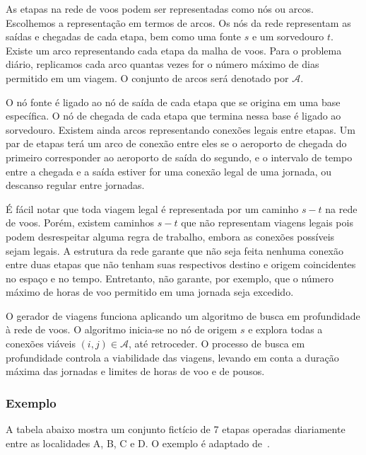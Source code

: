 \documentclass[12pt,a4paper]{article}
\newcommand{\calA}{\mathcal{A}}
\begin{document}
As etapas na rede de voos podem ser representadas como nós ou arcos. Escolhemos a representação em
termos de arcos. Os nós da rede representam as saídas e chegadas de cada etapa, bem como uma fonte
$s$ e um sorvedouro $t$. Existe um arco representando cada etapa da malha de voos. Para o problema
diário, replicamos cada arco quantas vezes for o número máximo de dias permitido em um viagem. O
conjunto de arcos será denotado por $\calA$.

O nó fonte é ligado ao nó de saída de cada etapa que se origina em uma base específica. O nó de
chegada de cada etapa que termina nessa base é ligado ao sorvedouro. Existem ainda arcos
representando conexões legais entre etapas. Um par de etapas terá um arco de conexão entre eles se
o aeroporto de chegada do primeiro corresponder ao aeroporto de saída do segundo, e o intervalo de
tempo entre a chegada e a saída estiver for uma conexão legal de uma jornada, 
ou descanso regular entre jornadas. 

É fácil notar que toda viagem legal é representada por um caminho $s-t$ na rede de voos. Porém,
existem caminhos $s-t$ que não representam viagens legais pois podem desrespeitar alguma regra de
trabalho, embora as conexões possíveis sejam legais. A estrutura da rede garante que não seja feita
nenhuma conexão entre duas etapas que não tenham suas respectivos destino e origem coincidentes no
espaço e no tempo. Entretanto, não garante, por exemplo, que o número máximo de horas de voo
permitido em uma jornada seja excedido. 

O gerador de viagens funciona aplicando um algoritmo de busca em profundidade à rede de voos. O
algoritmo inicia-se no nó de origem $s$ e explora todas a conexões viáveis $(i, j) \in \calA$, até
retroceder. O processo de busca em profundidade controla a viabilidade das viagens, levando em conta
a duração máxima das jornadas e limites de horas de voo e de pousos.

\subsubsection{Exemplo}
\label{sec:exemplo}

A tabela abaixo mostra um conjunto fictício de 7 etapas operadas diariamente entre as localidades A,
B, C e D. O exemplo é adaptado de~\cite{barnhart03}. 
\end{document}
